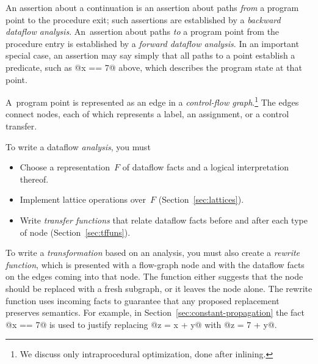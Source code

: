 \documentclass[blockstyle,preprint,natbib,nocopyrightspace]{sigplanconf}
\let\cite\citep
\newcommand\delendum[1]{\unskip\relax}
\newcommand\secref[1]{Section~\ref{sec:#1}}
\begin{document}
An assertion about a continuation is an assertion about paths
\emph{from} a program point 
to the procedure {exit};
such assertions are established by a \emph{backward dataflow analysis}.
An~assertion about paths \emph{to} a program point from the procedure
{entry} is established by a \emph{forward dataflow analysis}.
In an important special case,
an assertion may say simply
that all paths to a point establish a predicate, such as @x == 7@
above, which describes the program 
state at that point.


A~program point is represented as an edge in
a \emph{control-flow graph}.\footnote
{We discuss only intraprocedural optimization, done after inlining.}
The edges connect nodes, each of which represents a label, an assignment, or
a control transfer.

To write a dataflow \emph{analysis}, you must 
\begin{itemize}
\item
Choose a representation~$F$ of dataflow facts and a logical interpretation
thereof.
\item
Implement lattice operations over~$F$ (\secref{lattices}).
\item
Write \emph{transfer functions} that relate dataflow facts before and
after each type of node (\secref{tffuns}).
\delendum{I'd italicise key words from all three bullets, or none. NR:
It's not a question of bullets; the key concepts which are possibly
new to readers are transfer
functions and rewrite functions, which is why they are italicized.}
\end{itemize}

To write a \emph{transformation}
based on an analysis, you
must also
create a \emph{rewrite function}, which is presented with a
flow-graph node and with the dataflow facts on the edges coming
into that node.
The function either suggests that the node should be replaced with a
fresh subgraph, or it leaves the node alone.
The rewrite function uses incoming facts to guarantee that
any proposed replacement preserves semantics.
For example, in \secref{constant-propagation} the fact @x == 7@ is
used to justify replacing @z = x + y@ with @z = 7 + y@.
\end{document}
